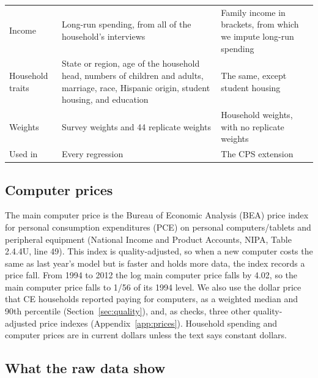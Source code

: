\documentclass[11pt]{article}
\begin{document}
\begin{table}[t]
\begin{tabular}{L{0.18\textwidth}L{0.38\textwidth}L{0.35\textwidth}}
\addlinespace
Income & Long-run spending, from all of the household's interviews & Family income in brackets, from which we impute long-run spending \\
\addlinespace
Household traits & State or region, age of the household head, numbers of children and adults, marriage, race, Hispanic origin, student housing, and education & The same, except student housing \\
\addlinespace
Weights & Survey weights and 44 replicate weights & Household weights, with no replicate weights \\
\addlinespace
Used in & Every regression & The CPS extension \\
\bottomrule
\end{tabular}
\end{table}

\subsection{Computer prices}

The main computer price is the Bureau of Economic Analysis (BEA) price index for personal consumption expenditures (PCE) on personal computers/tablets and peripheral equipment (National Income and Product Accounts, NIPA, Table 2.4.4U, line 49). This index is quality-adjusted, so when a new computer costs the same as last year's model but is faster and holds more data, the index records a price fall. From 1994 to 2012 the log main computer price falls by 4.02, so the main computer price falls to 1/56 of its 1994 level. We also use the dollar price that CE households reported paying for computers, as a weighted median and 90th percentile (Section~\ref{sec:quality}), and, as checks, three other quality-adjusted price indexes (Appendix~\ref{app:prices}). Household spending and computer prices are in current dollars unless the text says constant dollars.

\subsection{What the raw data show}
\label{sec:look}
\end{document}
